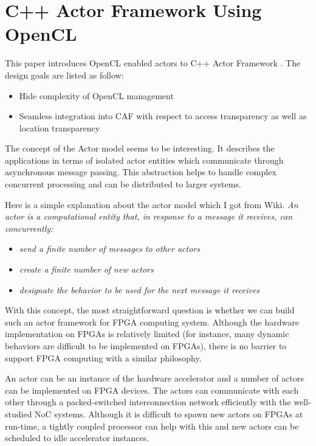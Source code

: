 \section{C++ Actor Framework Using OpenCL}
This paper introduces OpenCL enabled actors to C++ Actor Framework \cite{charousset2014caf, hiesgen2015manyfold}.
The design goals are listed as follow:
\begin{itemize}
    \item Hide complexity of OpenCL management
    \item Seamless integration into CAF with respect to access transparency as well as location
        transparency
\end{itemize}
    
The concept of the Actor model seems to be interesting. It describes the applications in terms of
isolated actor entities which communicate through asynchronous message passing. This abstraction
helps to handle complex concurrent processing and can be distributed to larger systems. 

Here is a simple explanation about the actor model which I got from Wiki.
\emph{An actor is a computational entity that, in response to a message it receives, can
concurrently:}
\begin{itemize}
    \item \emph{send a finite number of messages to other actors}
    \item \emph{create a finite number of new actors}
    \item \emph{designate the behavior to be used for the next message it receives}
\end{itemize}

With this concept, the most straightforward question is whether we can build 
such an actor framework for FPGA computing system. Although the hardware implementation on FPGAs
is relatively limited (for instance, many dynamic behaviors are difficult to be implemented on FPGAs), 
there is no barrier to support FPGA computing with a similar philosophy.   

An actor can be an instance of the hardware accelerator and a number of actors can be
implemented on FPGA devices. The actors can communicate with each other through 
a packed-switched interconnection network efficiently with the well-studied NoC systems. 
Although it is difficult to spawn new actors on FPGAs at run-time, a tightly coupled processor can help with
this and new actors can be scheduled to idle accelerator instances.

